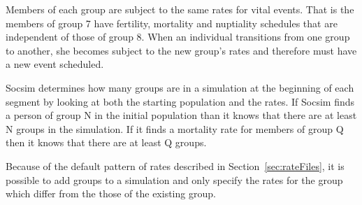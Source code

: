  Members of each group are subject to the same rates for vital
 events. That is the members of group 7 have fertility, mortality and
 nuptiality schedules that are independent of those of group 8.  When
 an individual transitions from one group to another, she becomes
 subject to the new group's rates and therefore must have a new event
 scheduled. 


 Socsim determines how many groups are in a simulation at the
 beginning of each segment by looking at both the starting population
 and the rates.  If Socsim finds a person of group N in the initial
 population than it knows that there are at least N groups in the
 simulation. If it finds a mortality rate for members of group Q then
 it knows that there are at least Q groups.

Because of the default pattern of rates described in
Section~\ref{sec:rateFiles}, it is possible to add groups to a
simulation and only specify the rates for the group which differ from
the those of the existing group.




